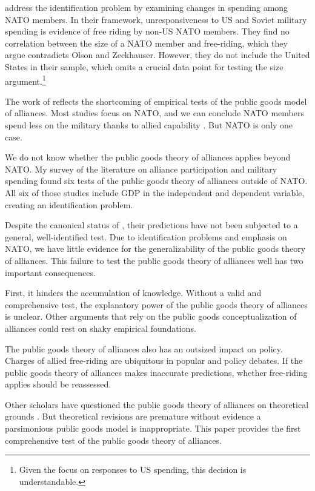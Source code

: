 \documentclass[12pt]{article}
\begin{document}
\citet{PluemperNeumayer2015} address the identification problem by examining changes in spending among NATO members. 
In their framework, unresponsiveness to US and Soviet military spending is evidence of free riding by non-US NATO members.
They find no correlation between the size of a NATO member and free-riding, which they argue contradicts Olson and Zeckhauser. 
However, they do not include the United States in their sample, which omits a crucial data point for testing the size argument.\footnote{Given the focus on responses to US spending, this decision is understandable.}


The work of \citet{PluemperNeumayer2015} reflects the shortcoming of empirical tests of the public goods model of alliances.
Most studies focus on NATO, and we can conclude NATO members spend less on the military thanks to allied capability \citep{GeorgeSandler2017}.
But NATO is only one case. 


We do not know whether the public goods theory of alliances applies beyond NATO. 
My survey of the literature on alliance participation and military spending found six tests of the public goods theory of alliances outside of NATO. 
All six of those studies include GDP in the independent and dependent variable, creating an identification problem. 


Despite the canonical status of \citet{OlsonZeckhauser1966}, their predictions have not been subjected to a general, well-identified test. 
Due to identification problems and emphasis on NATO, we have little evidence for the generalizability of the public goods theory of alliances.  
This failure to test the public goods theory of alliances well has two important consequences.

 
First, it hinders the accumulation of knowledge. 
Without a valid and comprehensive test, the explanatory power of the public goods theory of alliances is unclear. 
Other arguments that rely on the public goods conceptualization of alliances could rest on shaky empirical foundations. 


The public goods theory of alliances also has an outsized impact on policy. 
Charges of allied free-riding are ubiquitous in popular and policy debates. 
If the public goods theory of alliances makes inaccurate predictions, whether free-riding applies should be reassessed.


Other scholars have questioned the public goods theory of alliances on theoretical grounds \citep{Palmer1990, SandlerHartley2001}.  
But theoretical revisions are premature without evidence a parsimonious public goods model is inappropriate. 
This paper provides the first comprehensive test of the public goods theory of alliances.  
\end{document}
